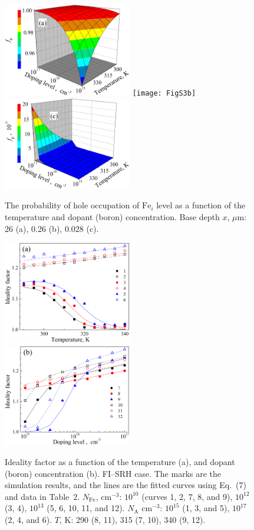 \documentclass [sort&compress] {elsarticle}
\begin{document}
\begin{figure}
\includegraphics[width=0.5\textwidth]{FigS3a}%
\texttt{[image: FigS3b]}
\includegraphics[width=0.5\textwidth]{FigS3c}
\caption{\label{figS3}
The probability of hole occupation of $\mathrm{Fe}_i$ level as a function of the temperature and dopant (boron) concentration.
Base depth $x$, $\mu$m: 26 (a), 0.26 (b), 0.028 (c).
}%
\end{figure}


\begin{figure}
\includegraphics[width=0.5\textwidth]{FigS4a}%
\includegraphics[width=0.5\textwidth]{FigS4b}
\caption{\label{figS4}
Ideality factor as a function of the temperature (a), and dopant (boron) concentration (b).
FI--SRH case.
The marks are the simulation results, and the lines are the fitted curves using Eq.~(7) and data in Table~2.
$N_\mathrm{Fe}$, cm$^{-3}$: $10^{10}$ (curves 1, 2, 7, 8, and 9), $10^{12}$ (3, 4), $10^{13}$ (5, 6, 10, 11, and 12).
$N_\mathrm{A}$ cm$^{-3}$: $10^{15}$ (1, 3, and 5), $10^{17}$ (2, 4, and 6).
$T$, K: 290 (8, 11), 315 (7, 10), 340 (9, 12).
}%
\end{figure}
\end{document}
